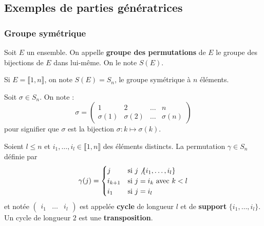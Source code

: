 	\newpage
	\subsection{Exemples de parties génératrices}

	\subsubsection{Groupe symétrique}


	\begin{definition}
		Soit $E$ un ensemble. On appelle \textbf{groupe des permutations} de $E$ le groupe des bijections de $E$ dans lui-même. On le note $S(E)$.
	\end{definition}

	\begin{notation}
		Si $E = \llbracket 1, n \rrbracket$, on note $S(E) = S_n$, le groupe symétrique à $n$ éléments.
	\end{notation}

	\begin{notation}
		Soit $\sigma \in S_n$. On note :
		\[
		\sigma =
		\begin{pmatrix}
			1 & 2 & \dots & n \\
			\sigma(1) & \sigma(2) & \dots & \sigma(n)
		\end{pmatrix}
		\]
		pour signifier que $\sigma$ est la bijection $\sigma : k \mapsto \sigma(k)$.
	\end{notation}

	\begin{definition}
		Soient $l \leq n$ et $i_1, \dots, i_l \in \llbracket 1, n \rrbracket$ des éléments distincts. La permutation $\gamma \in S_n$ définie par
		\[
		\gamma(j) =
		\begin{cases}
			j &\text{si } j \not \{ i_1, \dots, i_l \} \\
			i_{k+1} &\text{si } j = i_k \text{ avec } k<l \\
			i_1 &\text{si } j=i_l
		\end{cases}
		\]
		et notée $\begin{pmatrix} i_1 & \dots & i_l \end{pmatrix}$ est appelée \textbf{cycle} de longueur $l$ et de \textbf{support} $\{ i_1, \dots, i_l \}$. Un cycle de longueur $2$ est une \textbf{transposition}.
	\end{definition}


